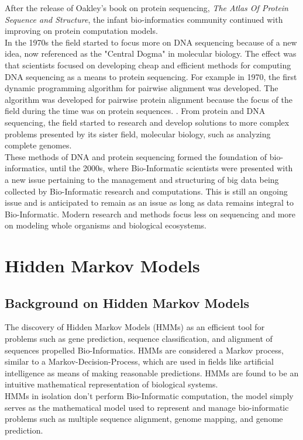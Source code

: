 \documentclass[12pt,journal,compsoc]{IEEEtran}
\begin{document}
After the release of Oakley's book on protein sequencing, \emph{The Atlas Of Protein Sequence and Structure}, the infant bio-informatics community continued with improving on protein computation models. \\  
In the 1970s the field started to focus more on DNA sequencing because of a new idea, now referenced as the "Central Dogma" in molecular biology. The effect was that scientists focused on developing cheap and efficient methods for computing DNA sequencing as a means to protein sequencing. For example in 1970, the first dynamic programming algorithm for pairwise alignment was developed. The algorithm was developed for pairwise protein alignment because the focus of the field during the time was on protein sequences.  \cite{Gauthier2018}. From protein and DNA sequencing, the field started to research and develop solutions to more complex problems presented by its sister field, molecular biology, such as analyzing complete genomes. \\
These methods of DNA and protein sequencing formed the foundation of bio-informatics, until the 2000s, where Bio-Informatic scientists were presented with a new issue pertaining to the management and structuring of big data being collected by Bio-Informatic research and computations. This is still an ongoing issue and is anticipated to remain as an issue as long as data remains integral to Bio-Informatic. Modern research and methods focus less on sequencing and more on modeling whole organisms and biological ecosystems.


\section{Hidden Markov Models}
\subsection{Background on Hidden Markov Models}
The discovery of Hidden Markov Models (HMMs) as an efficient tool for problems such as gene prediction, sequence classification, and alignment of sequences propelled Bio-Informatics. HMMs are considered a Markov process, similar to a Markov-Decision-Process, which are used in fields like artificial intelligence as means of making reasonable predictions. HMMs are found to be an intuitive mathematical representation of biological systems. \cite{7530222} \\
HMMs in isolation don't perform Bio-Informatic computation, the model simply serves as the mathematical model used to represent and manage bio-informatic problems such as multiple sequence alignment, genome mapping, and genome prediction.
\end{document}
